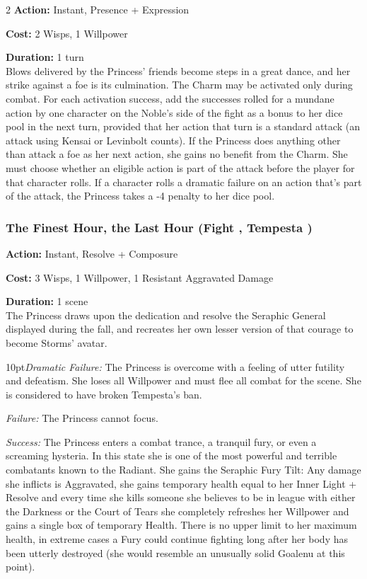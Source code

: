 \begin{multicols}{2}
\noindent \textbf{Action:} Instant, Presence + Expression

\noindent \textbf{Cost:} 2 Wisps, 1 Willpower

\noindent \textbf{Duration:} 1 turn\\

\noindent Blows delivered by the Princess' friends become steps in a great dance, and her strike against a foe is its culmination. The Charm may be activated only during combat. For each activation success, add the successes rolled for a mundane action by one character on the Noble's side of the fight as a bonus to her dice pool in the next turn, provided that her action that turn is a standard attack (an attack using Kensai or Levinbolt counts). If the Princess does anything other than attack a foe as her next action, she gains no benefit from the Charm. She must choose whether an eligible action is part of the attack before the player for that character rolls. If a character rolls a dramatic failure on an action that's part of the attack, the Princess takes a -4 penalty to her dice pool.

\subsubsection*{The Finest Hour, the Last Hour (Fight \textbullet\textbullet\textbullet\textbullet\textbullet, Tempesta \textbullet\textbullet\textbullet\textbullet)}

\noindent \textbf{Action:} Instant, Resolve + Composure

\noindent \textbf{Cost:} 3 Wisps, 1 Willpower, 1 Resistant Aggravated Damage

\noindent \textbf{Duration:} 1 scene \\

\noindent The Princess draws upon the dedication and resolve the Seraphic General displayed during the fall, and recreates her own lesser version of that courage to become Storms' avatar. 

    \begin{myindentpar}{10pt}\emph{Dramatic Failure:} The Princess is overcome with a feeling of utter futility and defeatism. She loses all Willpower and must flee all combat for the scene. She is considered to have broken Tempesta's ban.

    \emph{Failure:} The Princess cannot focus.

    \emph{Success:} The Princess enters a combat trance, a tranquil fury, or even a screaming hysteria. In this state she is one of the most powerful and terrible combatants known to the Radiant. She gains the Seraphic Fury Tilt: Any damage she inflicts is Aggravated, she gains temporary health equal to her Inner Light + Resolve and every time she kills someone she believes to be in league with either the Darkness or the Court of Tears she completely refreshes her Willpower and gains a single box of temporary Health. There is no upper limit to her maximum health, in extreme cases a Fury could continue fighting long after her body has been utterly destroyed (she would resemble an unusually solid Goalenu at this point). 


\end{myindentpar}
\end{multicols}
